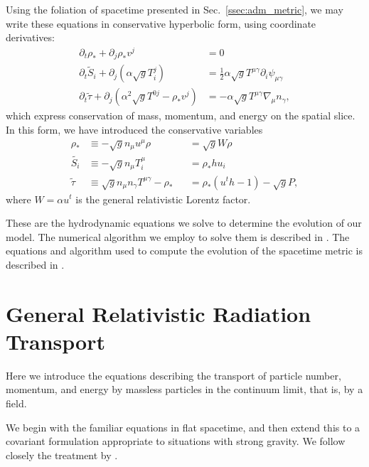 Using the foliation of spacetime presented in Sec.~\ref{ssec:adm_metric}, we may
write these equations in conservative hyperbolic form,
using coordinate derivatives:
\begin{align}
  \label{eqn:adm_hydro_mass}
  \partial_t \rho_* + \partial_j \rho_* v^j &= 0 \\
  \label{eqn:adm_hydro_mom}
  \partial_t \tilde{S}_i + \partial_j(\alpha\sqrt{g}T^j_i) &=
  \frac{1}{2}\alpha\sqrt{g}T^{\mu\gamma}\partial_i\psi_{\mu\gamma} \\
  \label{eqn:adm_hydro_ener}
  \partial_t \tilde{\tau} + \partial_j(\alpha^2\sqrt{g}T^{0j}-\rho_*v^j) &=
  -\alpha\sqrt{g}T^{\mu\gamma}\nabla_\mu n_\gamma,
\end{align}
which express conservation of mass, momentum, and energy on the spatial slice.
In this form, we have introduced the conservative variables
\begin{align}
  \label{eqn:rhostar}
  \rho_*       &\equiv -\sqrt{g} n_\mu u^\mu \rho &&= \sqrt{g}W\rho \\
  \label{eqn:tildeS}
  \tilde{S_i}  &\equiv -\sqrt{g} n_\mu T^\mu_i    &&= \rho_* h u_i \\
  \label{eqn:tildetau}
  \tilde{\tau} &\equiv  \sqrt{g} n_\mu n_\gamma T^{\mu\gamma} - \rho_*
  &&= \rho_*(u^t h-1)-\sqrt{g}P,
\end{align}
where $W=\alpha u^t$ is the general relativistic Lorentz factor.

These are the hydrodynamic equations we solve to determine the evolution of
our model. The numerical algorithm we employ to solve them is described
in \citet[App.~A]{fouc2013-compactness_and_spin}.
The equations and algorithm used to compute the
evolution of the spacetime metric is described in
\citet{lind2007-gen_harmonic}.

\section{General Relativistic Radiation Transport}
\label{sec:rad_transport}
Here we introduce the equations describing the transport of particle number,
momentum, and energy by massless particles in the continuum limit, that is,
by a field.

We begin with the familiar equations in flat spacetime, and then extend this
to a covariant formulation appropriate to situations with strong gravity.
We follow closely the treatment by \citet{miha1999-foundations}.

